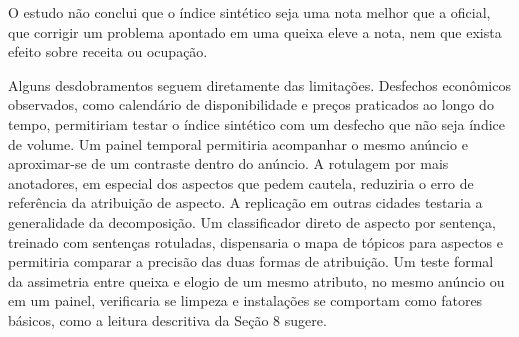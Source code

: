 O estudo não conclui que o índice sintético seja uma nota melhor que a oficial, que corrigir um problema apontado em uma queixa eleve a nota, nem que exista efeito sobre receita ou ocupação.

Alguns desdobramentos seguem diretamente das limitações. Desfechos econômicos observados, como calendário de disponibilidade e preços praticados ao longo do tempo, permitiriam testar o índice sintético com um desfecho que não seja índice de volume. Um painel temporal permitiria acompanhar o mesmo anúncio e aproximar-se de um contraste dentro do anúncio. A rotulagem por mais anotadores, em especial dos aspectos que pedem cautela, reduziria o erro de referência da atribuição de aspecto. A replicação em outras cidades testaria a generalidade da decomposição. Um classificador direto de aspecto por sentença, treinado com sentenças rotuladas, dispensaria o mapa de tópicos para aspectos e permitiria comparar a precisão das duas formas de atribuição. Um teste formal da assimetria entre queixa e elogio de um mesmo atributo, no mesmo anúncio ou em um painel, verificaria se limpeza e instalações se comportam como fatores básicos, como a leitura descritiva da Seção 8 sugere.
